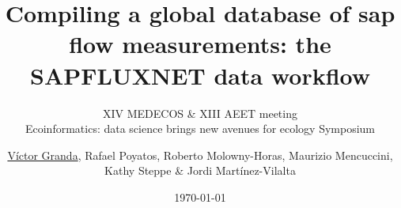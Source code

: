 \usepackage{textpos}
\usepackage{fontspec}

\setsansfont{Raleway}
\setmainfont{Sanchez}

\title[The SAPFLUXNET data workflow]{Compiling a global database of sap flow measurements: the SAPFLUXNET data workflow}
\subtitle{XIV MEDECOS \& XIII AEET meeting\\Ecoinformatics: data science brings new avenues for ecology Symposium}
\author[Víctor Granda \emph{et al.}]{\underline{Víctor Granda}, Rafael Poyatos, Roberto Molowny-Horas, Maurizio Mencuccini, Kathy Steppe \& Jordi Martínez-Vilalta}
\date{\today}

